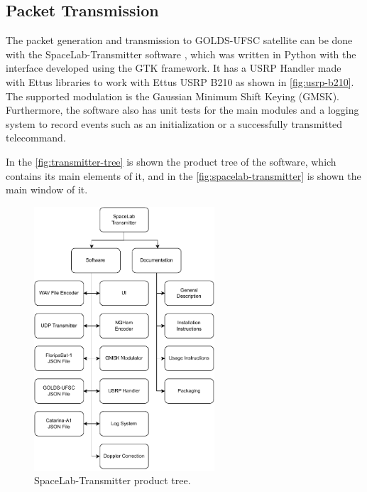 \subsection{Packet Transmission}

The packet generation and transmission to GOLDS-UFSC satellite can be done with the SpaceLab-Transmitter software \cite{spacelab-transmitter}, which was written in Python with the interface developed using the GTK framework. It has a USRP Handler made with Ettus libraries to work with Ettus USRP B210 as shown in \autoref{fig:usrp-b210}. The supported modulation is the Gaussian Minimum Shift Keying (GMSK). Furthermore, the software also has unit tests for the main modules and a logging system to record events such as an initialization or a successfully transmitted telecommand.

In the \autoref{fig:transmitter-tree} is shown the product tree of the software, which contains its main elements of it, and in the \autoref{fig:spacelab-transmitter} is shown the main window of it.

\begin{figure}[!ht]
    \begin{center}
        \includegraphics[width=0.6\textwidth]{figures/transmitter_tree.pdf}
        \caption{SpaceLab-Transmitter product tree.}
        \label{fig:transmitter-tree}
    \end{center}
\end{figure}

